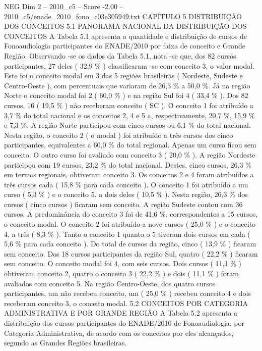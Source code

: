 \begin{textsample}{NEG Dim 2 – 2010\_c5 – Score -2.00 – 2010\_c5/enade\_2010\_fono\_c03e305949.txt}  \label{ex:f2_neg_108}
CAPÍTULO 5 DISTRIBUIÇÃO DOS CONCEITOS 5.1 PANORAMA NACIONAL DA DISTRIBUIÇÃO DOS CONCEITOS A Tabela 5.1 apresenta a quantidade e distribuição de cursos de Fonoaudiologia participantes do ENADE/2010 por faixa de conceito e Grande Região.
Observando -se os dados da Tabela 5.1, nota -se que, dos 82 cursos participantes, 27 deles ( 32,9 \% ) classificaram -se com conceito 3, o valor modal.
Este foi o conceito modal em 3 das 5 regiões brasileiras ( Nordeste, Sudeste e Centro-Oeste ), com percentuais que variaram de 26,3 \% a 50,0 \%.
Já na região Norte o conceito modal foi 2 ( 60,0 \% ) e na região Sul foi 4 ( 33,4 \% ).
Dos 82 cursos, 16 ( 19,5 \% ) não receberam conceito ( SC ).
O conceito 1 foi atribuído a 3,7 \% do total nacional e os conceitos 2, 4 e 5 a, respectivamente, 20,7 \%, 15,9 \% e 7,3 \%.
A região Norte participou com cinco cursos ou 6,1 \% do total nacional.
Nesta região, o conceito 2 ( o modal ) foi atribuído a três cursos dos cinco participantes, equivalentes a 60,0 \% do total regional.
Apenas um curso ficou sem conceito.
O outro curso foi avaliado com conceito 3 ( 20,0 \% ).
A região Nordeste participou com 19 cursos, 23,2 \% do total nacional.
Destes, cinco cursos, 26,3 \% em termos regionais, obtiveram conceito 3.
Os conceitos 2 e 4 foram atribuídos a três cursos cada ( 15,8 \% para cada conceito ).
O conceito 1 foi atribuído a um curso ( 5,3 \% ) e o conceito 5, a dois deles ( 10,5 \% ).
Nesta região, 26,3 \% dos cursos ( cinco cursos ) ficaram sem conceito.
A região Sudeste contou com 36 cursos.
A predominância do conceito 3 foi de 41,6 \%, correspondentes a 15 cursos, o conceito modal.
O conceito 2 foi atribuído a nove cursos ( 25,0 \% ) e o conceito 4, a três ( 8,3 \% ).
Tanto o conceito 1 quanto o 5 tiveram dois cursos em cada ( 5,6 \% para cada conceito ).
Do total de cursos da região, cinco ( 13,9 \% ) ficaram sem conceito.
Dos 18 cursos participantes da região Sul, quatro ( 22,2 \% ) ficaram sem conceito.
O conceito modal foi 4, com seis cursos.
Dois cursos ( 11,1 \% ) obtiveram conceito 2, quatro o conceito 3 ( 22,2 \% ) e dois ( 11,1 \% ) foram avaliados com conceito 5.
Na região Centro-Oeste, dos quatro cursos participantes, um não recebeu conceito, um ( 25,0 \% ) recebeu conceito 4 e dois receberam conceito 3, o conceito modal. 5.2 CONCEITOS POR CATEGORIA ADMINISTRATIVA E POR GRANDE REGIÃO A Tabela 5.2 apresenta a distribuição dos cursos participantes do ENADE/2010 de Fonoaudiologia, por Categoria Administrativa, de acordo com os conceitos por eles alcançados, segundo as Grandes Regiões brasileiras.

\end{textsample}
